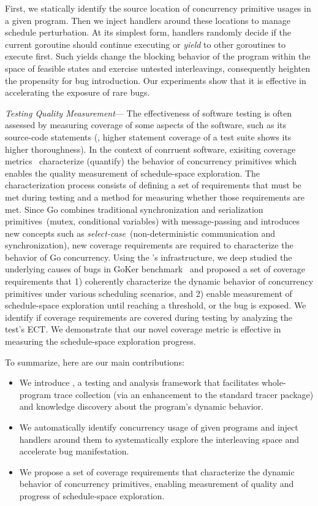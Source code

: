 %
First, we statically identify the source location of concurrency primitive usages in a given program.
%
%
Then we inject \goat handlers around these locations to manage schedule perturbation.
%
At its simplest form, handlers randomly decide if the current goroutine should continue executing or \textit{yield} to other goroutines to execute first.
%
Such yields change the blocking behavior of the program within the space of feasible states and exercise untested interleavings, consequently heighten the propensity for bug introduction.
%
Our experiments show that it is effective in accelerating the exposure of rare bugs.

 \textit{Testing Quality Measurement}---
The effectiveness of software testing is often assessed by measuring coverage of some aspects of the software, such as its source-code statements (\eg, higher statement coverage of a test suite shows its higher thoroughness).
%
In the context of conrruent software, exisiting coverage metrics~\cite{edelstein2003contest,trainin-followsCoverage-padtad09,hong-syncTesting-issta12,yu-pset-isca09} characterize (quantify) the behavior of concurrency primitives which enables the quality measurement of schedule-space exploration.
%
The characterization process consists of defining a set of requirements that must be met during testing and a method for measuring whether those requirements are met.
%
Since Go combines traditional synchronization and serialization primitives~(mutex, conditional variables) with message-passing and introduces new concepts such as \textit{select-case}~(non-deterministic communication and synchronization), new coverage requirements are required to characterize the behavior of Go concurrency.
%
Using the \goat's infrastructure, we deep studied the underlying causes of bugs in GoKer benchmark~\cite{yuan-gobench-cgo21} and proposed a set of coverage requirements that 1) coherently characterize the dynamic behavior of concurrency primitives under various scheduling scenarios, and 2) enable measurement of schedule-space exploration until reaching a threshold, or the bug is exposed.
%
We identify if coverage requirements are covered during testing by analyzing the test's ECT.
%
We demonstrate that our novel coverage metric is effective in measuring the schedule-space exploration progress.


To summarize, here are our main contributions:
\begin{itemize}
    \item We introduce \goat, a testing and analysis framework that facilitates whole-program trace collection (via an enhancement to the standard tracer package) and knowledge discovery about the program's dynamic behavior.
    \item We automatically identify concurrency usage of given programs and inject handlers around them to systematically explore the interleaving space and accelerate bug manifestation.
    \item We propose a set of coverage requirements that characterize the dynamic behavior of concurrency primitives, enabling measurement of quality and progress of schedule-space exploration.
\end{itemize}

